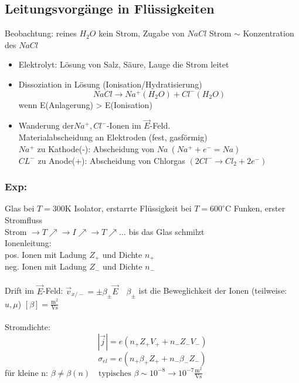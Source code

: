 \documentclass[titlepage,12pt,a4paper,ngerman]{report}
\newcommand{\tx}[1]{\textrm{#1}}
\begin{document}
\subsection{Leitungsvorgänge in Flüssigkeiten}
Beobachtung: reines $ H_2O $ kein Strom, Zugabe von $ NaCl $ Strom $\sim$ Konzentration des $ NaCl $
\begin{itemize}
	\item Elektrolyt: Lösung von Salz, Säure, Lauge die Strom leitet
	\item Dissoziation in Lösung (Ionisation/Hydratisierung)
	$$ NaCl \rightarrow Na^+ (H_2O) + Cl^- (H_2O)$$
	wenn E(Anlagerung) > E(Ionisation)
	\item Wanderung der$ Na^+ , Cl^- $-Ionen im $ \vec{E} $-Feld.\\ Materialabscheidung an Elektroden (fest, gasförmig)\\
	$ Na^+ $ zu Kathode(-): Abscheidung von $ Na  \ (Na^+ + e^- = Na)$\\
	$ CL^- $ zu Anode(+): Abscheidung von Chlorgas $ (2 Cl^- \rightarrow Cl_2 + 2 e^-) $
\end{itemize}
\subsubsection{Exp:} Glas bei $ T = 300 \tx{K} $ Isolator, erstarrte Flüssigkeit bei $ T = 600^\circ \tx{C} $ Funken, erster Stromfluss\\
Strom $ \rightarrow  T\nearrow \rightarrow I\nearrow \rightarrow T\nearrow \dots$ bis das Glas schmilzt\\
Ionenleitung:\\
pos. Ionen mit Ladung $ Z_+ $ und Dichte $ n_+ $\\
neg. Ionen mit Ladung $ Z_- $ und Dichte $ n_- $\\\\
Drift im $ \vec{E} $-Feld: $ \vec{v}_{x/-} = \pm \beta_{\pm} \vec{E} \quad \beta_{\pm}$ ist die Beweglichkeit der Ionen (teilweise: $ u, \mu $) $ [\beta] = \frac{\tx{m}^2}{\tx{Vs}} $\\\\
Stromdichte: 
$$|\vec{j}| = e(n_+ Z_+ V_+ + n_- Z_- V_-)$$
$$\sigma_{el} = e(n_+\beta_+ Z_+ + n_- \beta_- Z_-)$$
für kleine n: $ \beta \neq \beta(n) \quad \tx{typisches } \beta \sim 10^{-8} \rightarrow 10^{-7} \frac{\tx{m}^2}{\tx{Vs}}$
\end{document}
